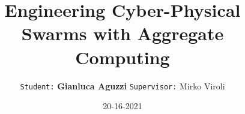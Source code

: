 

\title{
  {\fontfamily{\playfairfamily}\selectfont
  Engineering Cyber-Physical Swarms with Aggregate Computing
  }  
}
\author[G.Aguzzi]{
  \texttt{Student:} \textbf{Gianluca Aguzzi}
  \texttt{Supervisor:} Mirko Viroli
}
\date{ 20-16-2021 }
\talk{ }
